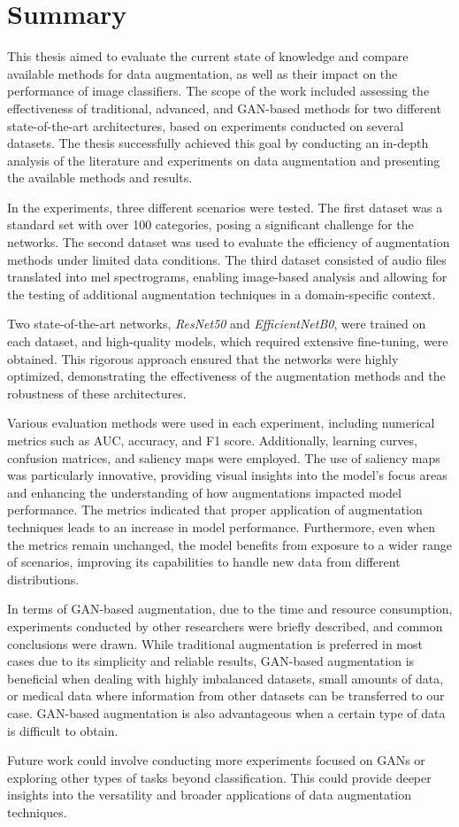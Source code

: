 \chapter{Summary}
\label{cha:Summary}

This thesis aimed to evaluate the current state of knowledge and compare available methods for data augmentation, as well as their impact on the performance of image classifiers. The scope of the work included assessing the effectiveness of traditional, advanced, and GAN-based methods for two different state-of-the-art architectures, based on experiments conducted on several datasets. The thesis successfully achieved this goal by conducting an in-depth analysis of the literature and experiments on data augmentation and presenting the available methods and results.

In the experiments, three different scenarios were tested. The first dataset was a standard set with over 100 categories, posing a significant challenge for the networks. The second dataset was used to evaluate the efficiency of augmentation methods under limited data conditions. The third dataset consisted of audio files translated into mel spectrograms, enabling image-based analysis and allowing for the testing of additional augmentation techniques in a domain-specific context.

Two state-of-the-art networks, \textit{ResNet50} and \textit{EfficientNetB0}, were trained on each dataset, and high-quality models, which required extensive fine-tuning, were obtained. This rigorous approach ensured that the networks were highly optimized, demonstrating the effectiveness of the augmentation methods and the robustness of these architectures.

Various evaluation methods were used in each experiment, including numerical metrics such as AUC, accuracy, and F1 score. Additionally, learning curves, confusion matrices, and saliency maps were employed. The use of saliency maps was particularly innovative, providing visual insights into the model's focus areas and enhancing the understanding of how augmentations impacted model performance. The metrics indicated that proper application of augmentation techniques leads to an increase in model performance. Furthermore, even when the metrics remain unchanged, the model benefits from exposure to a wider range of scenarios, improving its capabilities to handle new data from different distributions.

In terms of GAN-based augmentation, due to the time and resource consumption, experiments conducted by other researchers were briefly described, and common conclusions were drawn. While traditional augmentation is preferred in most cases due to its simplicity and reliable results, GAN-based augmentation is beneficial when dealing with highly imbalanced datasets, small amounts of data, or medical data where information from other datasets can be transferred to our case. GAN-based augmentation is also advantageous when a certain type of data is difficult to obtain.

Future work could involve conducting more experiments focused on GANs or exploring other types of tasks beyond classification. This could provide deeper insights into the versatility and broader applications of data augmentation techniques.
